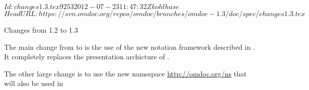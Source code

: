 \svnInfo $Id: changes1.3.tex 9253 2012-07-23 11:47:32Z kohlhase $
\svnKeyword $HeadURL: https://svn.omdoc.org/repos/omdoc/branches/omdoc-1.3/doc/spec/changes1.3.tex $

\begin{tsection}[id=changes1.3]{Changes from 1.2 to 1.3}

  The main change from {} to {} is the use of the new notation
  framework described in {}. It completely replaces the presentation
  archicture of {}.

  The other large change is to use the new namespace \url{http://omdoc.org/ns} that will
  also be used in {}


\end{tsection}
